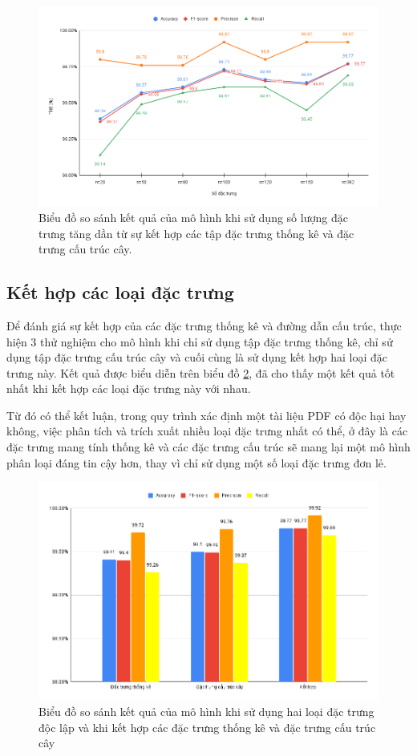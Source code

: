 \documentclass[./../main.tex]{subfiles}
\begin{document}
\begin{figure}[H]
	\centering
	\includegraphics[width=\linewidth]{./images/exp1_top_all_feat.png}
	\caption{Biểu đồ so sánh kết quả của mô hình khi sử dụng số lượng đặc trưng tăng dần từ sự kết hợp các tập đặc trưng thống kê và đặc trưng cấu trúc cây.}
	\label{fig:exp1_top_all_feat}
\end{figure}


\subsection{Kết hợp các loại đặc trưng}

Để đánh giá sự kết hợp của các đặc trưng thống kê và đường dẫn cấu trúc, thực hiện 3 thử nghiệm cho mô hình khi chỉ sử dụng tập đặc trưng thống kê, chỉ sử dụng tập đặc trưng cấu trúc cây và cuối cùng là sử dụng kết hợp hai loại đặc trưng này. Kết quả được biểu diễn trên biểu đồ \ref{fig:exp1_compare_combination}, đã cho thấy một kết quả tốt nhất khi kết hợp các loại đặc trưng này với nhau.

Từ đó có thể kết luận, trong quy trình xác định một tài liệu PDF có độc hại hay không, việc phân tích và trích xuất nhiều loại đặc trưng nhất có thể, ở đây là các đặc trưng mang tính thống kê và các đặc trưng cấu trúc sẽ mang lại một mô hình phân loại đáng tin cậy hơn, thay vì chỉ sử dụng một số loại đặc trưng đơn lẻ.

\begin{figure}[H]
	\centering
	\includegraphics[width=\linewidth]{./images/exp1_compare_combination.png}
	\caption{Biểu đồ so sánh kết quả của mô hình khi sử dụng hai loại đặc trưng độc lập và khi kết hợp các đặc trưng thống kê và đặc trưng cấu trúc cây}
	\label{fig:exp1_compare_combination}
\end{figure}
\end{document}
